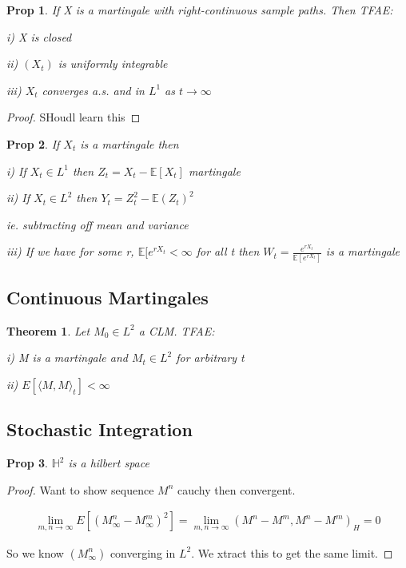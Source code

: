 \documentclass[11pt]{article}
\newcommand{\E}{\mathbb{E}}
\newtheorem{prop}{Prop}
\newtheorem{theorem}{Theorem}
\begin{document}
\begin{prop}
	If X is a martingale with right-continuous sample paths. Then TFAE:

i) X is closed

ii) $(X_t)$ is uniformly integrable

iii) $X_t$ converges a.s. and in $L^1$ as $t \to \infty$
\end{prop}

\begin{proof}
	SHoudl learn this
\end{proof}

\begin{prop}
	If $X_t$ is a martingale then 
	
	i) If $X_t \in L^1$ then $Z_t = X_t - \E[X_t]$ martingale

	ii) If $X_t \in L^2$ then $Y_t = Z_t^2 - \E(Z_t)^2$

	ie. subtracting off mean and variance

	iii) If we have for some r, $\E[e^{r X_t} < \infty$ for all t then $W_t = \frac{e^{r X_t}}{\E[e^{r X_t}]}$ is a martingale
\end{prop}

\subsection{Continuous Martingales}

\begin{theorem}
	Let $M_0 \in L^2$ a CLM. TFAE:

	i) M is a martingale and $M_t \in L^2$ for arbitrary t

	ii) $E[\langle M,M \rangle_t] < \infty$
\end{theorem}

\subsection{Stochastic Integration}

\begin{prop}
	$\mathbb{H}^2$ is a hilbert space
\end{prop}

\begin{proof}
	Want to show sequence $M^n$ cauchy then convergent. 

	\begin{align*}
		\lim_{m,n \to \infty}E[(M_{\infty}^n-M_{\infty}^m)^2] = \lim_{m,n \to \infty}(M^n - M^m,M^n- M^m)_H = 0
	\end{align*}

	So we know $(M_{\infty}^n)$ converging in $L^2$. We xtract this to get the same limit. 
\end{proof}
\end{document}
